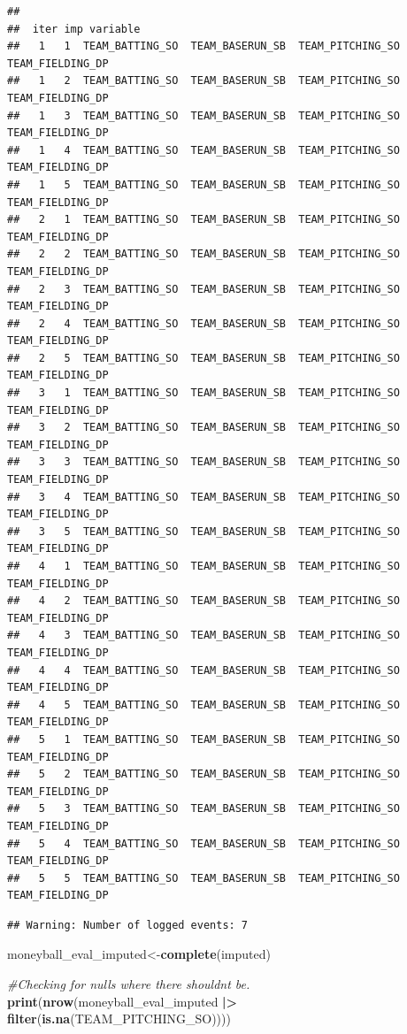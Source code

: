 \documentclass[
]{article}
\newenvironment{Shaded}{\begin{snugshade}}{\end{snugshade}}
\newcommand{\CommentTok}[1]{\textcolor[rgb]{0.56,0.35,0.01}{\textit{#1}}}
\newcommand{\FunctionTok}[1]{\textcolor[rgb]{0.13,0.29,0.53}{\textbf{#1}}}
\newcommand{\NormalTok}[1]{#1}
\newcommand{\OtherTok}[1]{\textcolor[rgb]{0.56,0.35,0.01}{#1}}
\newcommand{\SpecialCharTok}[1]{\textcolor[rgb]{0.81,0.36,0.00}{\textbf{#1}}}
\begin{document}
\begin{verbatim}
## 
##  iter imp variable
##   1   1  TEAM_BATTING_SO  TEAM_BASERUN_SB  TEAM_PITCHING_SO  TEAM_FIELDING_DP
##   1   2  TEAM_BATTING_SO  TEAM_BASERUN_SB  TEAM_PITCHING_SO  TEAM_FIELDING_DP
##   1   3  TEAM_BATTING_SO  TEAM_BASERUN_SB  TEAM_PITCHING_SO  TEAM_FIELDING_DP
##   1   4  TEAM_BATTING_SO  TEAM_BASERUN_SB  TEAM_PITCHING_SO  TEAM_FIELDING_DP
##   1   5  TEAM_BATTING_SO  TEAM_BASERUN_SB  TEAM_PITCHING_SO  TEAM_FIELDING_DP
##   2   1  TEAM_BATTING_SO  TEAM_BASERUN_SB  TEAM_PITCHING_SO  TEAM_FIELDING_DP
##   2   2  TEAM_BATTING_SO  TEAM_BASERUN_SB  TEAM_PITCHING_SO  TEAM_FIELDING_DP
##   2   3  TEAM_BATTING_SO  TEAM_BASERUN_SB  TEAM_PITCHING_SO  TEAM_FIELDING_DP
##   2   4  TEAM_BATTING_SO  TEAM_BASERUN_SB  TEAM_PITCHING_SO  TEAM_FIELDING_DP
##   2   5  TEAM_BATTING_SO  TEAM_BASERUN_SB  TEAM_PITCHING_SO  TEAM_FIELDING_DP
##   3   1  TEAM_BATTING_SO  TEAM_BASERUN_SB  TEAM_PITCHING_SO  TEAM_FIELDING_DP
##   3   2  TEAM_BATTING_SO  TEAM_BASERUN_SB  TEAM_PITCHING_SO  TEAM_FIELDING_DP
##   3   3  TEAM_BATTING_SO  TEAM_BASERUN_SB  TEAM_PITCHING_SO  TEAM_FIELDING_DP
##   3   4  TEAM_BATTING_SO  TEAM_BASERUN_SB  TEAM_PITCHING_SO  TEAM_FIELDING_DP
##   3   5  TEAM_BATTING_SO  TEAM_BASERUN_SB  TEAM_PITCHING_SO  TEAM_FIELDING_DP
##   4   1  TEAM_BATTING_SO  TEAM_BASERUN_SB  TEAM_PITCHING_SO  TEAM_FIELDING_DP
##   4   2  TEAM_BATTING_SO  TEAM_BASERUN_SB  TEAM_PITCHING_SO  TEAM_FIELDING_DP
##   4   3  TEAM_BATTING_SO  TEAM_BASERUN_SB  TEAM_PITCHING_SO  TEAM_FIELDING_DP
##   4   4  TEAM_BATTING_SO  TEAM_BASERUN_SB  TEAM_PITCHING_SO  TEAM_FIELDING_DP
##   4   5  TEAM_BATTING_SO  TEAM_BASERUN_SB  TEAM_PITCHING_SO  TEAM_FIELDING_DP
##   5   1  TEAM_BATTING_SO  TEAM_BASERUN_SB  TEAM_PITCHING_SO  TEAM_FIELDING_DP
##   5   2  TEAM_BATTING_SO  TEAM_BASERUN_SB  TEAM_PITCHING_SO  TEAM_FIELDING_DP
##   5   3  TEAM_BATTING_SO  TEAM_BASERUN_SB  TEAM_PITCHING_SO  TEAM_FIELDING_DP
##   5   4  TEAM_BATTING_SO  TEAM_BASERUN_SB  TEAM_PITCHING_SO  TEAM_FIELDING_DP
##   5   5  TEAM_BATTING_SO  TEAM_BASERUN_SB  TEAM_PITCHING_SO  TEAM_FIELDING_DP
\end{verbatim}

\begin{verbatim}
## Warning: Number of logged events: 7
\end{verbatim}

\begin{Shaded}
\begin{Highlighting}[]
\NormalTok{moneyball\_eval\_imputed}\OtherTok{\textless{}{-}}\FunctionTok{complete}\NormalTok{(imputed)}

\CommentTok{\#Checking for nulls where there shouldnt be.}
\FunctionTok{print}\NormalTok{(}\FunctionTok{nrow}\NormalTok{(moneyball\_eval\_imputed }\SpecialCharTok{|\textgreater{}} \FunctionTok{filter}\NormalTok{(}\FunctionTok{is.na}\NormalTok{(TEAM\_PITCHING\_SO))))}
\end{Highlighting}
\end{Shaded}
\end{document}
